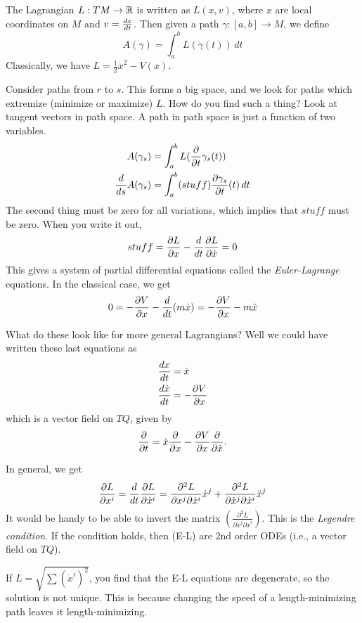  \setcounter{lecture}{11}

 The Lagrangian $L:TM\to \mathbb{R}$ is written as $L(x,v)$, where $x$
 are local coordinates on $M$ and $v=\frac{d x}{d t}$.  Then given a
 path $\gamma:[a,b]\to M$, we define
 \[
    A(\gamma) = \int_a^b L(\dot\gamma(t))\, dt
 \]
 Classically, we have $L=\frac{1}{2}\dot{x}^2 - V(x)$.

 Consider paths from $r$ to $s$.  This forms a big space, and we
 look for paths which extremize (minimize or maximize) $L$.  How
 do you find such a thing?  Look at tangent vectors in path space.
 A path in path space is just a function of two variables.
 \begin{align*}
    A(\gamma_s) &=  \int_a^b L(\frac{\partial }{\partial t}\gamma_s(t)) \\
    \frac{d }{d s}A(\gamma_s) &= \int_a^b
    (stuff)\frac{\partial \gamma_s}{\partial t}(t)\, dt
 \end{align*}
 The second thing must be zero for all variations, which implies
 that $stuff$ must be zero.  When you write it out,
 \[
    stuff = \frac{\partial L}{\partial x}-\frac{d }{d t}\frac{\partial L}{\partial \dot{x}}=0
 \]
 This gives a system of partial differential equations called the
 \emph{Euler-Lagrange} equations.  In the classical case, we
 get
 \[
    0 = -\frac{\partial V}{\partial x} - \frac{d }{d t}(m\dot{x}) = -\frac{\partial V}{\partial x}-m\ddot{x}
 \]

 What do these look like for more general Lagrangians?  Well we
 could have written these last equations as
 \begin{align*}
   \frac{d x}{d t} &= \dot{x}\\
   \frac{d \dot{x}}{d t} &= -\frac{\partial V}{\partial x}
 \end{align*}
 which is a vector field on $TQ$, given by
 \[
    \frac{\partial }{\partial t} = \dot{x}\frac{\partial }{\partial x} -\frac{\partial V}{\partial x}\frac{\partial }{\partial \dot{x}}.
 \]

 In general, we get
 \[
    \frac{\partial L}{\partial x^i} = \frac{d }{d t}\frac{\partial L}{\partial \dot{x}^i} =
    \frac{\partial^2L}{\partial x^j\partial \dot{x}^i} \dot{x}^j +
    \frac{\partial^2L}{\partial \dot{x}^j\partial \dot{x}^i} \ddot{x}^j
 \]
 It would be handy to be able to invert the matrix $\left(\frac{\partial^2L}{\partial \dot{x}^j\partial
 \dot{x}^i}\right)$.  This is the \emph{Legendre condition}.  If the
 condition holds, then (E-L) are 2nd order ODEs (i.e., a vector
 field on $TQ$).



 If $L = \sqrt{\sum (\dot{x}^i)^2}$, you find that the E-L equations
 are degenerate, so the solution is not unique.  This is because
 changing the speed of a length-minimizing path leaves it
 length-minimizing.

